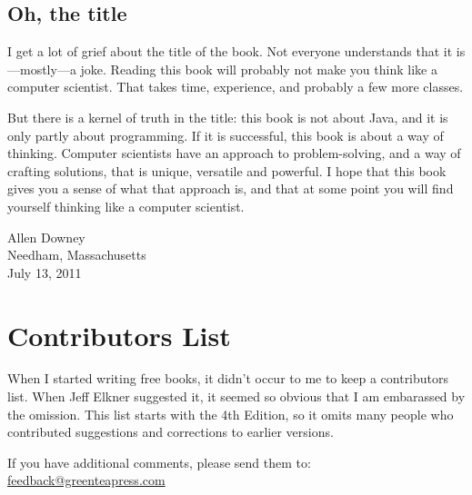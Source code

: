 \documentclass[12pt]{book}
\theoremstyle{exercise}
\begin{document}
\subsection*{Oh, the title}

I get a lot of grief about the title of the book.  Not everyone
understands that it is---mostly---a joke.
Reading this book will probably not make you think like a computer
scientist.  That takes time, experience, and probably a few more
classes.

But there is a kernel of truth in the title: this book is not
about Java, and it is only partly about programming.  If it is
successful, this book is about a way of thinking.  Computer scientists
have an approach to problem-solving, and a way of crafting solutions,
that is unique, versatile and powerful.  I hope that this book
gives you a sense of what that approach is, and that at some
point you will find yourself thinking like a computer scientist.

\vspace{0.2in}

\begin{flushleft}
Allen Downey\\
Needham, Massachusetts\\
July 13, 2011
\end{flushleft}


\section*{Contributors List}

When I started writing free books, it didn't occur to me to keep
a contributors list.  When Jeff Elkner suggested it, it seemed so
obvious that I am embarassed by the omission.  This list starts
with the 4th Edition, so it omits many people who contributed
suggestions and corrections to earlier versions.

If you have additional comments, please send them to: \\
\href{mailto:feedback@greenteapress.com}{feedback@greenteapress.com}
\end{document}
